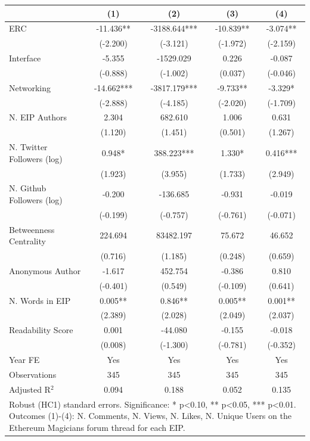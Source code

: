\begin{tabular}{lcccc}
\toprule
 & (1) & (2) & (3) & (4) \\
\midrule
ERC & -11.436** & -3188.644*** & -10.839** & -3.074** \\
 & (-2.200) & (-3.121) & (-1.972) & (-2.159) \\
Interface & -5.355 & -1529.029 & 0.226 & -0.087 \\
 & (-0.888) & (-1.002) & (0.037) & (-0.046) \\
Networking & -14.662*** & -3817.179*** & -9.733** & -3.329* \\
 & (-2.888) & (-4.185) & (-2.020) & (-1.709) \\
N. EIP Authors & 2.304 & 682.610 & 1.006 & 0.631 \\
 & (1.120) & (1.451) & (0.501) & (1.267) \\
N. Twitter Followers (log) & 0.948* & 388.223*** & 1.330* & 0.416*** \\
 & (1.923) & (3.955) & (1.733) & (2.949) \\
N. Github Followers (log) & -0.200 & -136.685 & -0.931 & -0.019 \\
 & (-0.199) & (-0.757) & (-0.761) & (-0.071) \\
Betweenness Centrality & 224.694 & 83482.197 & 75.672 & 46.652 \\
 & (0.716) & (1.185) & (0.248) & (0.659) \\
Anonymous Author & -1.617 & 452.754 & -0.386 & 0.810 \\
 & (-0.401) & (0.549) & (-0.109) & (0.641) \\
N. Words in EIP & 0.005** & 0.846** & 0.005** & 0.001** \\
 & (2.389) & (2.028) & (2.049) & (2.037) \\
Readability Score & 0.001 & -44.080 & -0.155 & -0.018 \\
 & (0.008) & (-1.300) & (-0.781) & (-0.352) \\
\midrule
Year FE & Yes & Yes & Yes & Yes \\
\midrule
Observations & 345 & 345 & 345 & 345 \\
Adjusted R$^2$ & 0.094 & 0.188 & 0.052 & 0.135 \\
\bottomrule
\multicolumn{5}{l}{\footnotesize Robust (HC1) standard errors. Significance: * p<0.10, ** p<0.05, *** p<0.01. Outcomes (1)-(4): N. Comments, N. Views, N. Likes, N. Unique Users on the Ethereum Magicians forum thread for each EIP.} \\
\end{tabular}
